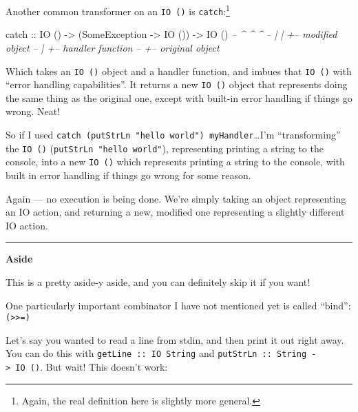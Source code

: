 \documentclass[]{article}
\newenvironment{Shaded}{}{}
\newcommand{\DataTypeTok}[1]{\textcolor[rgb]{0.56,0.13,0.00}{{#1}}}
\newcommand{\CommentTok}[1]{\textcolor[rgb]{0.38,0.63,0.69}{\textit{{#1}}}}
\newcommand{\OtherTok}[1]{\textcolor[rgb]{0.00,0.44,0.13}{{#1}}}
\newcommand{\NormalTok}[1]{{#1}}
\begin{document}
Another common transformer on an \texttt{IO\ ()} is
\texttt{catch}:\footnote{Again, the real definition here is slightly
  more general.}

\begin{Shaded}
\begin{Highlighting}[]
\NormalTok{catch}\OtherTok{ ::} \DataTypeTok{IO} \NormalTok{() }\OtherTok{->} \NormalTok{(}\DataTypeTok{SomeException} \OtherTok{->} \DataTypeTok{IO} \NormalTok{()) }\OtherTok{->} \DataTypeTok{IO} \NormalTok{()}
\CommentTok{--       ^         ^                          ^}
\CommentTok{--       |         |                          +-- modified object}
\CommentTok{--       |         +-- handler function}
\CommentTok{--       +-- original object}
\end{Highlighting}
\end{Shaded}

Which takes an \texttt{IO\ ()} object and a handler function, and imbues
that \texttt{IO\ ()} with ``error handling capabilities''. It returns a
new \texttt{IO\ ()} object that represents doing the same thing as the
original one, except with built-in error handling if things go wrong.
Neat!

So if I used
\texttt{catch\ (putStrLn\ "hello\ world")\ myHandler}\ldots{}I'm
``transforming'' the \texttt{IO\ ()}
(\texttt{putStrLn\ "hello\ world"}), representing printing a string to
the console, into a new \texttt{IO\ ()} which represents printing a
string to the console, with built in error handling if things go wrong
for some reason.

Again --- no execution is being done. We're simply taking an object
representing an IO action, and returning a new, modified one
representing a slightly different IO action.

\begin{center}\rule{0.5\linewidth}{\linethickness}\end{center}

\textbf{Aside}

This is a pretty aside-y aside, and you can definitely skip it if you
want!

One particularly important combinator I have not mentioned yet is called
``bind'': \texttt{(\textgreater{}\textgreater{}=)}

Let's say you wanted to read a line from stdin, and then print it out
right away. You can do this with \texttt{getLine\ ::\ IO\ String} and
\texttt{putStrLn\ ::\ String\ -\textgreater{}\ IO\ ()}. But wait! This
doesn't work:
\end{document}
